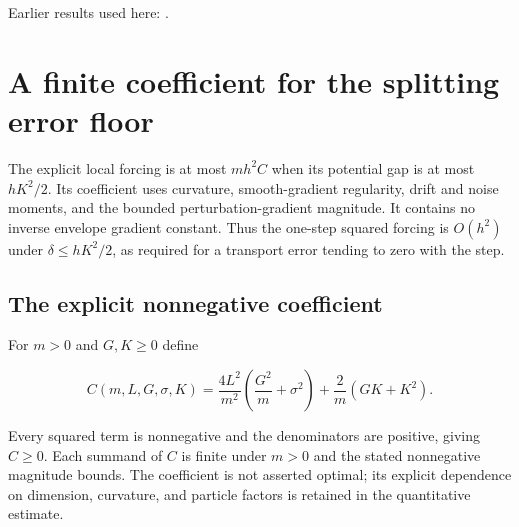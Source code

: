 \documentclass[11pt,a4paper]{report}
\begin{document}
Earlier results used here: \cite[Section~3.1.1]{LangevinLean2026IPLA}.
\section{\texorpdfstring{A finite coefficient for the splitting error floor}{A finite coefficient for the splitting error floor}}
\label{proof-module-ProximalLangevin-SplittingRate-lean}


The explicit local forcing is at most \(mh^2C\) when its potential gap is at most \(hK^2/2\). Its coefficient uses curvature, smooth-gradient regularity, drift and noise moments, and the bounded perturbation-gradient magnitude. It contains no inverse envelope gradient constant. Thus the one-step squared forcing is \(O(h^2)\) under \(\delta\le hK^2/2\), as required for a transport error tending to zero with the step.

\subsection{\texorpdfstring{The explicit nonnegative coefficient}{The explicit nonnegative coefficient}}
\label{report-step-ProximalLangevin-SplittingRate-lean-1}


For \(m>0\) and \(G,K\ge0\) define

\[C(m,L,G,\sigma,K)=\frac{4L^2}{m^2}\left(\frac{G^2}{m}+\sigma^2\right)+\frac2m(GK+K^2).\]

Every squared term is nonnegative and the denominators are positive, giving \(C\ge0\). Each summand of \(C\) is finite under \(m>0\) and the stated nonnegative magnitude bounds. The coefficient is not asserted optimal; its explicit dependence on dimension, curvature, and particle factors is retained in the quantitative estimate.
\end{document}
